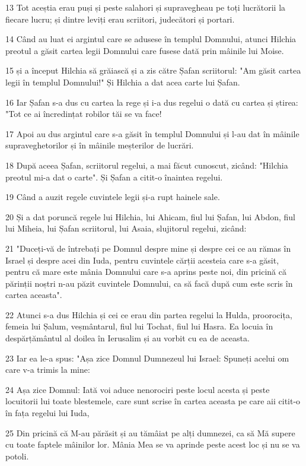 \par 13 Tot aceștia erau puși și peste salahori și supravegheau pe toți lucrătorii la fiecare lucru; și dintre leviți erau scriitori, judecători și portari.
\par 14 Când au luat ei argintul care se adusese în templul Domnului, atunci Hilchia preotul a găsit cartea legii Domnului care fusese dată prin mâinile lui Moise.
\par 15 și a început Hilchia să grăiască și a zis către Șafan scriitorul: "Am găsit cartea legii în templul Domnului!" Și Hilchia a dat acea carte lui Șafan.
\par 16 Iar Șafan s-a dus cu cartea la rege și i-a dus regelui o dată cu cartea și știrea: "Tot ce ai încredințat robilor tăi se va face!
\par 17 Apoi au dus argintul care s-a găsit în templul Domnului și l-au dat în mâinile supraveghetorilor și în mâinile meșterilor de lucrări.
\par 18 După aceea Șafan, scriitorul regelui, a mai făcut cunoscut, zicând: "Hilchia preotul mi-a dat o carte". Și Șafan a citit-o înaintea regelui.
\par 19 Când a auzit regele cuvintele legii și-a rupt hainele sale.
\par 20 Și a dat poruncă regele lui Hilchia, lui Ahicam, fiul lui Șafan, lui Abdon, fiul lui Miheia, lui Șafan scriitorul, lui Asaia, slujitorul regelui, zicând:
\par 21 "Duceți-vă de întrebați pe Domnul despre mine și despre cei ce au rămas în Israel și despre acei din Iuda, pentru cuvintele cărții acesteia care s-a găsit, pentru că mare este mânia Domnului care s-a aprins peste noi, din pricină că părinții noștri n-au păzit cuvintele Domnului, ca să facă după cum este scris în cartea aceasta".
\par 22 Atunci s-a dus Hilchia și cei ce erau din partea regelui la Hulda, proorocița, femeia lui Șalum, veșmântarul, fiul lui Tochat, fiul lui Hasra. Ea locuia în despărțământul al doilea în Ierusalim și au vorbit cu ea de aceasta.
\par 23 Iar ea le-a spus: "Așa zice Domnul Dumnezeul lui Israel: Spuneți acelui om care v-a trimis la mine:
\par 24 Așa zice Domnul: Iată voi aduce nenorociri peste locul acesta și peste locuitorii lui toate blestemele, care sunt scrise în cartea aceasta pe care aii citit-o în fața regelui lui Iuda,
\par 25 Din pricină că M-au părăsit și au tămâiat pe alți dumnezei, ca să Mă supere cu toate faptele mâinilor lor. Mânia Mea se va aprinde peste acest loc și nu se va potoli.
